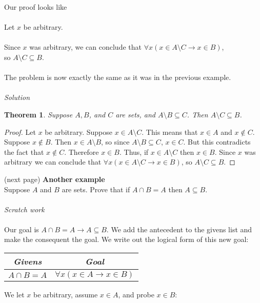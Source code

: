 \documentclass{report}
\newtheorem*{theorem}{Theorem}
\theoremstyle{definition}
\begin{document}
Our proof looks like\\
\vspace{1mm}\\
\indent Let $x$ be arbitrary.\\
\indent{}\\
\indent Since $x$ was arbitrary, we can conclude that $\forall x(x\in A\setminus C\to x\in B)$,\\
\indent so $A\setminus C\subseteq B$.\\
\vspace{1mm}\\
The problem is now exactly the same as it was in the previous example.\\
\vspace{1mm}\\
\textit{Solution}
\begin{theorem}
Suppose $A,B$, and $C$ are sets, and $A\setminus B\subseteq C$. Then $A\setminus C\subseteq B$.
\end{theorem}
\begin{proof}
Let $x$ be arbitrary. Suppose $x\in A\setminus C$. This means that $x\in A$ and $x\notin C$. Suppose $x\notin B$. Then $x\in A\setminus B$, so since $A\setminus B\subseteq C$, $x\in C$. But
this contradicts the fact that $x\notin C$. Therefore $x\in B$. Thus, if $x\in A\setminus C$ then $x\in B$. Since $x$ was arbitrary we can conclude that $\forall x(x\in A\setminus C\to x\in B)$, so
$A\setminus C\subseteq B$.
\end{proof}
\noindent(next page)\newpage
\noindent\textbf{Another example}\\
Suppose $A$ and $B$ are sets. Prove that if $A\cap B=A$ then $A\subseteq B$.\\
\vspace{1mm}\\
\textit{Scratch work}\\
\vspace{1mm}\\
Our goal is $A\cap B=A\to A\subseteq B$. We add the antecedent to the givens list and make the consequent the goal. We write out the logical form of this new goal:
\begin{center}
\begin{tabular}{c|c}
\textit{Givens}&\textit{Goal}\\
\hline
$A\cap B=A$&$\forall x(x\in A\to x\in B)$
\end{tabular}
\end{center}
We let $x$ be arbitrary, assume $x\in A$, and probe $x\in B$:
\end{document}
